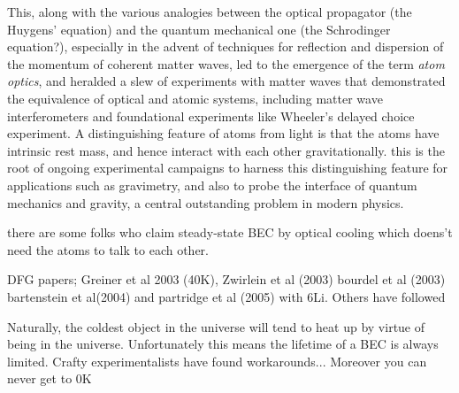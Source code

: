 	This, along with the various analogies between the optical propagator	(the Huygens' equation) and the quantum mechanical one (the Schrodinger	equation?), especially in the advent of techniques for reflection and	dispersion of the momentum of coherent matter waves, led to the	emergence of the term \emph{atom optics}, and heralded a slew of	experiments with matter waves that demonstrated the equivalence of	optical and atomic systems, including matter wave interferometers and	foundational experiments like Wheeler's delayed choice experiment.
	A	distinguishing feature of atoms from light is that the atoms have	intrinsic rest mass, and hence interact with each other gravitationally.	this is the root of ongoing experimental campaigns to harness this	distinguishing feature for applications such as gravimetry, and also to	probe the interface of quantum mechanics and gravity, a central	outstanding problem in modern physics.

	there are some folks who claim steady-state BEC by optical cooling which doens't need the atoms to talk to each other.

	DFG papers; Greiner et al 2003 (40K), Zwirlein et al (2003) bourdel et al (2003) bartenstein et al(2004) and partridge et al (2005) with 6Li.
	Others have followed

	Naturally, the coldest object in the universe will tend to heat up by virtue of being in the universe.
	Unfortunately this means the lifetime of a BEC is always limited.
	Crafty experimentalists have found workarounds...
	Moreover you can never get to 0K



